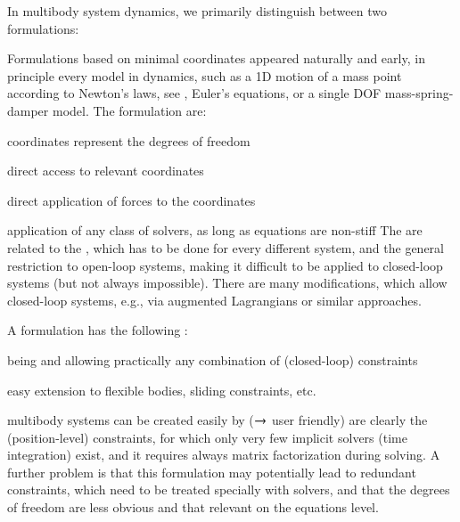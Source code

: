 %
In multibody system dynamics, we primarily distinguish between two formulations:
\bi
  \item {}
  \item {}
\ei
Formulations based on minimal coordinates appeared naturally and early, in principle every model in dynamics, 
such as a 1D motion of a mass point according to Newton's laws, see , Euler's equations, or a single DOF mass-spring-damper model. 
The  formulation are:
\bi
  \item coordinates represent the degrees of freedom
  \item direct access to relevant coordinates
  \item direct application of forces to the coordinates
  \item application of any class of solvers, as long as equations are non-stiff
\ei
The  are related to the , which has to be done for every different system,
and the general restriction to open-loop systems, making it difficult to be applied to closed-loop systems (but not always impossible). 
There are many modifications, which allow closed-loop systems, e.g., via augmented Lagrangians or similar approaches.

\noindent A  formulation has the following :
\bi
  \item being  and allowing practically any combination of (closed-loop) constraints
  \item easy extension to flexible bodies, sliding constraints, etc.
  \item multibody systems can be created easily by  ($\rightarrow$ user friendly)
\ei
{} are clearly the  (position-level) constraints, 
for which only very few implicit solvers (time integration) exist, and it requires always matrix factorization during solving.
A further problem is that this formulation may potentially lead to redundant constraints, which need to be treated specially with solvers,
and that the degrees of freedom are less obvious and that relevant  on the equations level.

